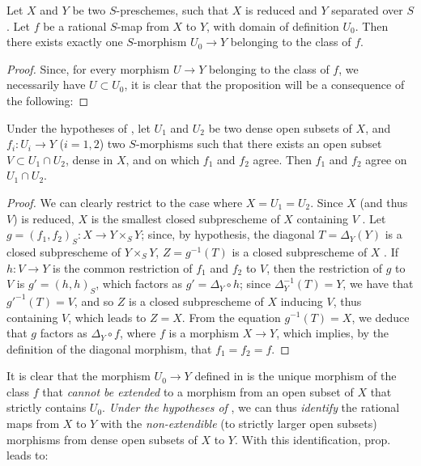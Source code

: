 \begin{prop}[7.2.2]
\label{1.7.2.2}
Let $X$ and $Y$ be two $S$-preschemes, such that $X$ is reduced and $Y$ separated over $S$.
Let $f$ be a rational $S$-map from $X$ to $Y$, with domain of definition $U_0$.
Then there exists exactly one $S$-morphism $U_0\to Y$ belonging to the class of $f$.
\end{prop}

\begin{proof}
\label{proof-1.7.2.2}
Since, for every morphism $U\to Y$ belonging to the class of $f$, we necessarily have $U\subset U_0$, it is clear that the proposition will be a consequence of the following:
\end{proof}

\begin{lem}[7.2.2.1]
\label{1.7.2.2.1}
Under the hypotheses of , let $U_1$ and $U_2$ be two dense open subsets of $X$, and $f_i\colon U_i\to Y$ ($i=1,2$) two $S$-morphisms such that there exists an open subset $V\subset U_1\cap U_2$, dense in $X$, and on which $f_1$ and $f_2$ agree.
Then $f_1$ and $f_2$ agree on $U_1\cap U_2$.
\end{lem}

\begin{proof}
\label{proof-1.7.2.2.1}
We can clearly restrict to the case where $X=U_1=U_2$.
Since $X$ (and thus $V$) is reduced, $X$ is the smallest closed subprescheme of $X$ containing $V$ .
Let $g=(f_1,f_2)_S\colon X\to Y\times_S Y$; since, by hypothesis, the diagonal $T=\Delta_Y(Y)$ is a closed subprescheme of $Y\times_S Y$, $Z=g^{-1}(T)$ is a closed subprescheme of $X$ .
If $h\colon V\to Y$ is the common restriction of $f_1$ and $f_2$ to $V$, then the restriction of $g$ to $V$ is $g'=(h,h)_S$, which factors as $g'=\Delta_Y\circ h$; since $\Delta_Y^{-1}(T)=Y$, we have that $g'^{-1}(T)=V$, and so $Z$ is a closed subprescheme of $X$ inducing $V$, thus containing $V$, which leads to $Z=X$.
From the equation $g^{-1}(T)=X$, we deduce  that $g$ factors as $\Delta_Y\circ f$, where $f$ is a morphism $X\to Y$, which implies, by the definition of the diagonal morphism, that $f_1=f_2=f$.
\end{proof}

It is clear that the morphism $U_0\to Y$ defined in  is the unique morphism of the class $f$ that \emph{cannot be extended} to a morphism from an open subset of $X$ that strictly contains $U_0$.
\emph{Under the hypotheses of }, we can thus \emph{identify} the rational maps from $X$ to $Y$ with the \emph{non-extendible} (to strictly larger open subsets) morphisms from dense open subsets of $X$ to $Y$.
With this identification, prop.~ leads to:

